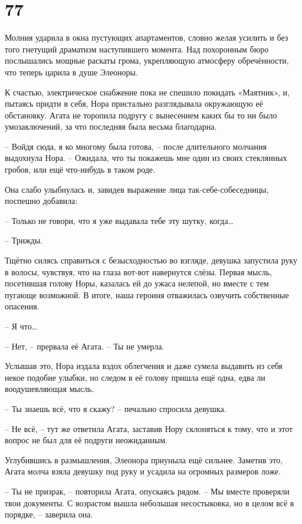 \documentclass[
  a5paperpaper,
  DIV=11,
  numbers=noendperiod]{scrreprt}
\begin{document}
\section*{77}\label{77}


Молния ударила в окна пустующих апартаментов, словно желая усилить и без
того гнетущий драматизм наступившего момента. Над похоронным бюро
послышались мощные раскаты грома, укрепляющую атмосферу обречённости,
что теперь царила в душе Элеоноры.

К счастью, электрическое снабжение пока не спешило покидать «Маятник»,
и, пытаясь придти в себя, Нора пристально разглядывала окружающую её
обстановку. Агата не торопила подругу с вынесением каких бы то ни было
умозаключений, за что последняя была весьма благодарна.

-- Войдя сюда, я ко многому была готова, -- после длительного молчания
выдохнула Нора. -- Ожидала, что ты покажешь мне один из своих стеклянных
гробов, или ещё что-нибудь в таком роде.

Она слабо улыбнулась и, завидев выражение лица так-себе-собеседницы,
поспешно добавила:

-- Только не говори, что я уже выдавала тебе эту шутку, когда\ldots{}

-- Трижды.

Тщётно силясь справиться с безысходностью во взгляде, девушка запустила
руку в волосы, чувствуя, что на глаза вот-вот навернутся слёзы. Первая
мысль, посетившая голову Норы, казалась ей до ужаса нелепой, но вместе с
тем пугающе возможной. В итоге, наша героиня отважилась озвучить
собственные опасения.

-- Я что\ldots{}

-- Нет, -- прервала её Агата. -- Ты не умерла.

Услышав это, Нора издала вздох облегчения и даже сумела выдавить из себя
некое подобие улыбки, но следом в её голову пришла ещё одна, едва ли
воодушевляющая мысль.

-- Ты знаешь всё, что я скажу? -- печально спросила девушка.

-- Не всё, -- тут же ответила Агата, заставив Нору склоняться к тому,
что и этот вопрос не был для её подруги неожиданным.

Углубившись в размышления, Элеонора приуныла ещё сильнее. Заметив это,
Агата молча взяла девушку под руку и усадила на огромных размеров ложе.

-- Ты не призрак, -- повторила Агата, опускаясь рядом. -- Мы вместе
проверяли твои документы. С возрастом вышла небольшая несостыковка, но в
целом всё в порядке, -- заверила она.
\end{document}
